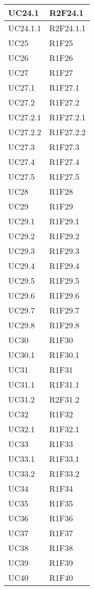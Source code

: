 \begin{center}
\begin{longtable}{|p{44mm}|p{22mm}|}
\hline
UC24.1 &
R2F24.1 
\\
\hline
UC24.1.1 &
R2F24.1.1 
\\
\hline
UC25 &
R1F25 
\\
\hline
UC26 &
R1F26 
\\
\hline
UC27 &
R1F27 
\\
\hline
UC27.1 &
R1F27.1 
\\
\hline
UC27.2 &
R1F27.2 
\\
\hline
UC27.2.1 &
R1F27.2.1 
\\
\hline
UC27.2.2 &
R1F27.2.2 
\\
\hline
UC27.3 &
R1F27.3 
\\
\hline
UC27.4 &
R1F27.4 
\\
\hline
UC27.5 &
R1F27.5 
\\
\hline
UC28 &
R1F28 
\\
\hline
UC29 &
R1F29 
\\
\hline
UC29.1 &
R1F29.1 
\\
\hline
UC29.2 &
R1F29.2 
\\
\hline
UC29.3 &
R1F29.3 
\\
\hline
UC29.4 &
R1F29.4 
\\
\hline
UC29.5 &
R1F29.5 
\\
\hline
UC29.6 &
R1F29.6 
\\
\hline
UC29.7 &
R1F29.7 
\\
\hline
UC29.8 &
R1F29.8 
\\
\hline
UC30 &
R1F30 
\\
\hline
UC30.1 &
R1F30.1 
\\
\hline
UC31 &
R1F31 
\\
\hline
UC31.1 &
R1F31.1 
\\
\hline
UC31.2 &
R2F31.2 
\\
\hline
UC32 &
R1F32 
\\
\hline
UC32.1 &
R1F32.1 
\\
\hline
UC33 &
R1F33 
\\
\hline
UC33.1 &
R1F33.1 
\\
\hline
UC33.2 &
R1F33.2 
\\
\hline
UC34 &
R1F34 
\\
\hline
UC35 &
R1F35 
\\
\hline
UC36 &
R1F36 
\\
\hline
UC37 &
R1F37 
\\
\hline
UC38 &
R1F38 
\\
\hline
UC39 &
R1F39 
\\
\hline
UC40 &
R1F40 
\\
\hline%

	\end{longtable}
\end{center}

